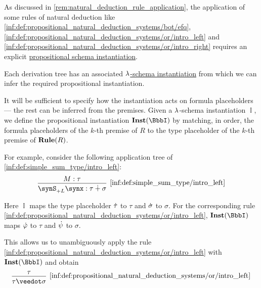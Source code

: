 \begin{algorithm}
\begin{thmenum}
     As discussed in \cref{rem:natural_deduction_rule_application}, the application of some rules of natural deduction like \ref{inf:def:propositional_natural_deduction_systems/bot/efq}, \ref{inf:def:propositional_natural_deduction_systems/or/intro_left} and \ref{inf:def:propositional_natural_deduction_systems/or/intro_right} requires an explicit \hyperref[def:propositional_schema_instantiation]{propositional schema instantiation}.

    Each derivation tree has an associated \hyperref[def:lambda_schema_instantiation]{\( {\mathrm \lambda} \)-schema instantiation} from which we can infer the required propositional instantiation.

    It will be sufficient to specify how the instantiation acts on formula placeholders --- the rest can be inferred from the premises. Given a \( {\mathrm \lambda} \)-schema instantiation \( \BbbI \), we define the propositional instantiation \( \op*{Inst}(\BbbI) \) by matching, in order, the formula placeholders of the \( k \)-th premise of \( R \) to the type placeholder of the \( k \)-th premise of \( \op*{Rule}(R) \).

    For example, consider the following application tree of \ref{inf:def:simple_sum_type/intro_left}:
    \begin{equation*}
      \begin{prooftree}
        \hypo{ M: \tau }
        \infer1[\ref{inf:def:simple_sum_type/intro_left}]{ \synS_{+L} \synx: \tau \synplus \sigma }
      \end{prooftree}
    \end{equation*}

    Here \( \BbbI \) maps the type placeholder \( \dot{\tau} \) to \( \tau \) and \( \dot{\sigma} \) to \( \sigma \). For the corresponding rule \ref{inf:def:propositional_natural_deduction_systems/or/intro_left}, \( \op*{Inst}(\BbbI) \) maps \( \dot{\varphi} \) to \( \tau \) and \( \dot{\psi} \) to \( \sigma \).

    This allows us to unambiguously apply the rule \ref{inf:def:propositional_natural_deduction_systems/or/intro_left} with \( \op*{Inst}(\BbbI) \) and obtain
    \begin{equation*}
      \begin{prooftree}
        \hypo{ \tau }
        \infer1[\ref{inf:def:propositional_natural_deduction_systems/or/intro_left}]{ \tau \synvee \sigma }
      \end{prooftree}
    \end{equation*}


\end{thmenum}
\end{algorithm}
